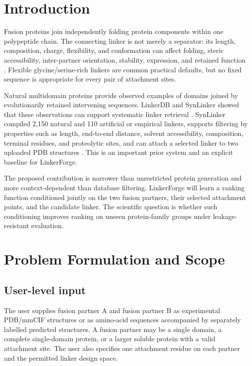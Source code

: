\documentclass[10pt,a4paper]{article}
\begin{document}
\section{Introduction}

Fusion proteins join independently folding protein components within one polypeptide chain. The connecting linker is not merely a separator: its length, composition, charge, flexibility, and conformation can affect folding, steric accessibility, inter-partner orientation, stability, expression, and retained function \citep{chen2013,george2002}. Flexible glycine/serine-rich linkers are common practical defaults, but no fixed sequence is appropriate for every pair of attachment sites.

Natural multidomain proteins provide observed examples of domains joined by evolutionarily retained intervening sequences. LinkerDB and SynLinker showed that these observations can support systematic linker retrieval \citep{george2002,liu2015}. SynLinker compiled 2,150 natural and 110 artificial or empirical linkers, supports filtering by properties such as length, end-to-end distance, solvent accessibility, composition, terminal residues, and proteolytic sites, and can attach a selected linker to two uploaded PDB structures \citep{liu2015}. This is an important prior system and an explicit baseline for LinkerForge.

The proposed contribution is narrower than unrestricted protein generation and more context-dependent than database filtering. LinkerForge will learn a ranking function conditioned jointly on the two fusion partners, their selected attachment points, and the candidate linker. The scientific question is whether such conditioning improves ranking on unseen protein-family groups under leakage-resistant evaluation.

\section{Problem Formulation and Scope}

\subsection{User-level input}

The user supplies fusion partner A and fusion partner B as experimental PDB/mmCIF structures or as amino-acid sequences accompanied by separately labelled predicted structures. A fusion partner may be a single domain, a complete single-domain protein, or a larger soluble protein with a valid attachment site. The user also specifies one attachment residue on each partner and the permitted linker design space.
\end{document}
